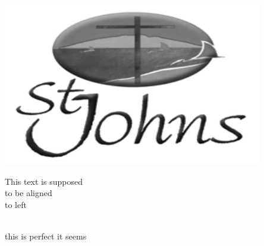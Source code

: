 

\begin{minipage}{0.3\textwidth}

\includegraphics[width=\linewidth]{stjohns-logo.png}

\end{minipage}

\begin{minipage}{0.6\textwidth}\raggedleft

This text is supposed\\

to be aligned\\

to left\\

\end{minipage}

\noindent

\\

this is perfect it seems
